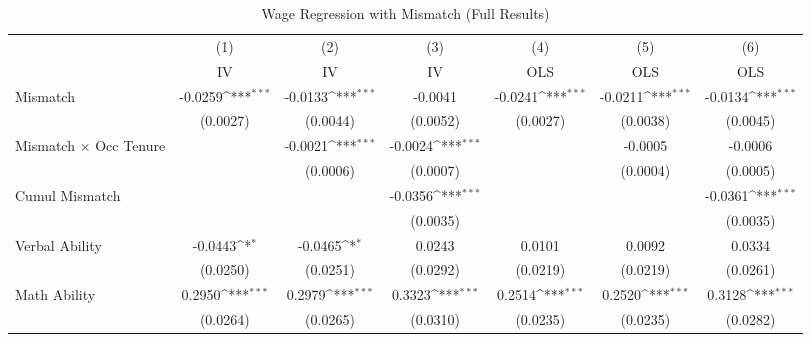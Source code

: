 {
\def\sym#1{\ifmmode^{#1}\else\(^{#1}\)\fi}
\begin{longtable}{l*{6}{c}}
\caption{Wage Regression with Mismatch (Full Results)}\\
\hline  \endfirsthead\hline  \endhead\hline  \endfoot\endlastfoot
                    &\multicolumn{1}{c}{(1)}&\multicolumn{1}{c}{(2)}&\multicolumn{1}{c}{(3)}&\multicolumn{1}{c}{(4)}&\multicolumn{1}{c}{(5)}&\multicolumn{1}{c}{(6)}\\
                    &\multicolumn{1}{c}{IV}&\multicolumn{1}{c}{IV}&\multicolumn{1}{c}{IV}&\multicolumn{1}{c}{OLS}&\multicolumn{1}{c}{OLS}&\multicolumn{1}{c}{OLS}\\
\hline  
Mismatch            &     -0.0259\sym{***}&     -0.0133\sym{***}&     -0.0041         &     -0.0241\sym{***}&     -0.0211\sym{***}&     -0.0134\sym{***}\\
                    &    (0.0027)         &    (0.0044)         &    (0.0052)         &    (0.0027)         &    (0.0038)         &    (0.0045)         \\
Mismatch $\times$ Occ Tenure&                     &     -0.0021\sym{***}&     -0.0024\sym{***}&                     &     -0.0005         &     -0.0006         \\
                    &                     &    (0.0006)         &    (0.0007)         &                     &    (0.0004)         &    (0.0005)         \\
Cumul Mismatch      &                     &                     &     -0.0356\sym{***}&                     &                     &     -0.0361\sym{***}\\
                    &                     &                     &    (0.0035)         &                     &                     &    (0.0035)         \\
Verbal Ability      &     -0.0443\sym{*}  &     -0.0465\sym{*}  &      0.0243         &      0.0101         &      0.0092         &      0.0334         \\
                    &    (0.0250)         &    (0.0251)         &    (0.0292)         &    (0.0219)         &    (0.0219)         &    (0.0261)         \\
Math Ability        &      0.2950\sym{***}&      0.2979\sym{***}&      0.3323\sym{***}&      0.2514\sym{***}&      0.2520\sym{***}&      0.3128\sym{***}\\
                    &    (0.0264)         &    (0.0265)         &    (0.0310)         &    (0.0235)         &    (0.0235)         &    (0.0282)         \\

\end{longtable}}
